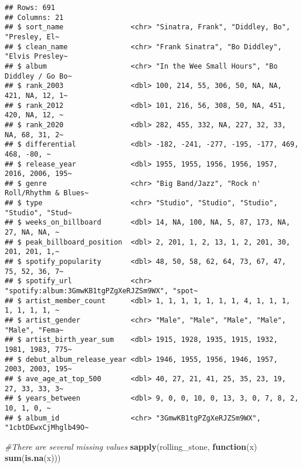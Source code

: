\documentclass[
]{article}
\newenvironment{Shaded}{\begin{snugshade}}{\end{snugshade}}
\newcommand{\CommentTok}[1]{\textcolor[rgb]{0.56,0.35,0.01}{\textit{#1}}}
\newcommand{\ControlFlowTok}[1]{\textcolor[rgb]{0.13,0.29,0.53}{\textbf{#1}}}
\newcommand{\FunctionTok}[1]{\textcolor[rgb]{0.13,0.29,0.53}{\textbf{#1}}}
\newcommand{\NormalTok}[1]{#1}
\begin{document}
\begin{verbatim}
## Rows: 691
## Columns: 21
## $ sort_name                <chr> "Sinatra, Frank", "Diddley, Bo", "Presley, El~
## $ clean_name               <chr> "Frank Sinatra", "Bo Diddley", "Elvis Presley~
## $ album                    <chr> "In the Wee Small Hours", "Bo Diddley / Go Bo~
## $ rank_2003                <dbl> 100, 214, 55, 306, 50, NA, NA, 421, NA, 12, 1~
## $ rank_2012                <dbl> 101, 216, 56, 308, 50, NA, 451, 420, NA, 12, ~
## $ rank_2020                <dbl> 282, 455, 332, NA, 227, 32, 33, NA, 68, 31, 2~
## $ differential             <dbl> -182, -241, -277, -195, -177, 469, 468, -80, ~
## $ release_year             <dbl> 1955, 1955, 1956, 1956, 1957, 2016, 2006, 195~
## $ genre                    <chr> "Big Band/Jazz", "Rock n' Roll/Rhythm & Blues~
## $ type                     <chr> "Studio", "Studio", "Studio", "Studio", "Stud~
## $ weeks_on_billboard       <dbl> 14, NA, 100, NA, 5, 87, 173, NA, 27, NA, NA, ~
## $ peak_billboard_position  <dbl> 2, 201, 1, 2, 13, 1, 2, 201, 30, 201, 201, 1,~
## $ spotify_popularity       <dbl> 48, 50, 58, 62, 64, 73, 67, 47, 75, 52, 36, 7~
## $ spotify_url              <chr> "spotify:album:3GmwKB1tgPZgXeRJZSm9WX", "spot~
## $ artist_member_count      <dbl> 1, 1, 1, 1, 1, 1, 1, 4, 1, 1, 1, 1, 1, 1, 1, ~
## $ artist_gender            <chr> "Male", "Male", "Male", "Male", "Male", "Fema~
## $ artist_birth_year_sum    <dbl> 1915, 1928, 1935, 1915, 1932, 1981, 1983, 775~
## $ debut_album_release_year <dbl> 1946, 1955, 1956, 1946, 1957, 2003, 2003, 195~
## $ ave_age_at_top_500       <dbl> 40, 27, 21, 41, 25, 35, 23, 19, 27, 33, 33, 3~
## $ years_between            <dbl> 9, 0, 0, 10, 0, 13, 3, 0, 7, 8, 2, 10, 1, 0, ~
## $ album_id                 <chr> "3GmwKB1tgPZgXeRJZSm9WX", "1cbtDEwxCjMhglb49O~
\end{verbatim}

\begin{Shaded}
\begin{Highlighting}[]
\CommentTok{\#There are several missing values}
\FunctionTok{sapply}\NormalTok{(rolling\_stone, }\ControlFlowTok{function}\NormalTok{(x) }\FunctionTok{sum}\NormalTok{(}\FunctionTok{is.na}\NormalTok{(x)))}
\end{Highlighting}
\end{Shaded}
\end{document}
